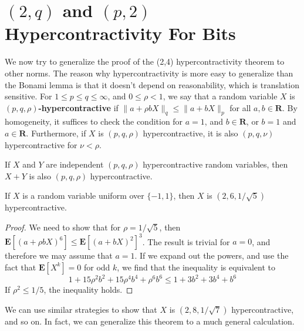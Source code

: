 \section{$(2,q)$ and $(p,2)$ Hypercontractivity For Bits}

We now try to generalize the proof of the (2,4) hypercontractivity theorem to other norms. The reason why hypercontractivity is more easy to generalize than the Bonami lemma is that it doesn't depend on reasonability, which is translation sensitive. For $1 \leq p \leq q \leq \infty$, and $0 \leq \rho < 1$, we say that a random variable $X$ is {\bf $(p,q,\rho)$-hypercontractive} if $\| a + \rho b X \|_q \leq \| a + b X \|_p$ for all $a,b \in \mathbf{R}$. By homogeneity, it suffices to check the condition for $a = 1$, and $b \in \mathbf{R}$, or $b = 1$ and $a \in \mathbf{R}$. Furthermore, if $X$ is $(p,q,\rho)$ hypercontractive, it is also $(p,q,\nu)$ hypercontractive for $\nu < \rho$.

\begin{theorem}
    If $X$ and $Y$ are independent $(p,q,\rho)$ hypercontractive random variables, then $X + Y$ is also $(p,q,\rho)$ hypercontractive.
\end{theorem}

\begin{theorem}
    If $X$ is a random variable uniform over $\{ -1, 1 \}$, then $X$ is $(2,6,1/\sqrt{5})$ hypercontractive.
\end{theorem}
\begin{proof}
    We need to show that for $\rho = 1/\sqrt{5}$, then $\mathbf{E}[(a + \rho b X)^6] \leq \mathbf{E}[(a + bX)^2]^3$. The result is trivial for $a = 0$, and therefore we may assume that $a = 1$. If we expand out the powers, and use the fact that $\mathbf{E}[X^k] = 0$ for odd $k$, we find that the inequality is equivalent to
    \[ 1 + 15 \rho^2 b^2 + 15 \rho^4 b^4 + \rho^6 b^6 \leq 1 + 3b^2 + 3b^4 + b^6 \]
    If $\rho^2 \leq 1/5$, the inequality holds.
\end{proof}

We can use similar strategies to show that $X$ is $(2,8,1/\sqrt{7})$ hypercontractive, and so on. In fact, we can generalize this theorem to a much general calculation.

